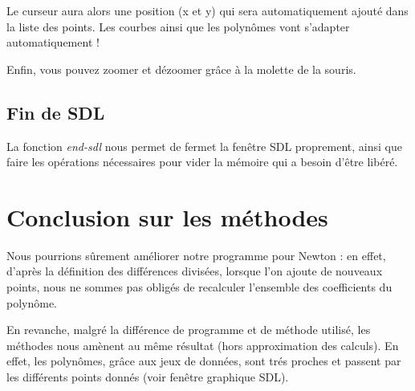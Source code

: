 \documentclass[letter]{article}
\begin{document}
Le curseur aura alors une position (x et y) qui sera automatiquement ajouté dans la liste des points. Les courbes ainsi que les polynômes vont s'adapter automatiquement !


Enfin, vous pouvez zoomer et dézoomer grâce à la molette de la souris.


\subsection{Fin de SDL}
\label{sec:org7f41e7c}

La fonction \emph{end-sdl} nous permet de fermet la fenêtre SDL proprement, ainsi que faire les opérations nécessaires pour vider la mémoire qui a besoin d'être libéré.

\section{Conclusion sur les méthodes}
\label{sec:org509595d}

Nous pourrions sûrement améliorer notre programme pour Newton : en effet, d'après la définition des différences divisées, lorsque l'on ajoute de nouveaux points, nous ne sommes pas obligés de recalculer l'ensemble des coefficients du polynôme.


En revanche, malgré la différence de programme et de méthode utilisé, les méthodes nous amènent au même résultat (hors approximation des calculs). En effet, les polynômes, grâce aux jeux de données, sont trés proches et passent par les différents points donnés (voir fenêtre graphique SDL).
\end{document}
